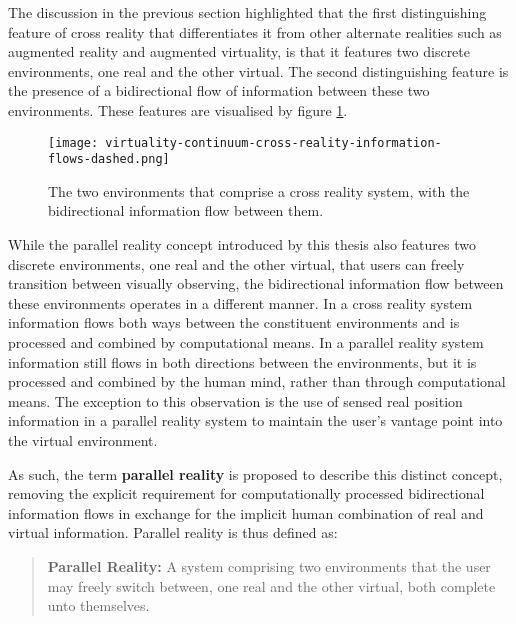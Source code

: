 The discussion in the previous section highlighted that the first distinguishing feature of cross reality that differentiates it from other alternate realities such as augmented reality and augmented virtuality, is that it features two discrete environments, one real and the other virtual. The second distinguishing feature is the presence of a bidirectional flow of information between these two environments. These features are visualised by figure \ref{virtuality-continuum-cross-reality-information-flows-dashed.png}.

\begin{figure}[h]
	\begin{center}
		\texttt{[image: virtuality-continuum-cross-reality-information-flows-dashed.png]}
		\caption{The two environments that comprise a cross reality system, with the bidirectional information flow between them.}
		\label{virtuality-continuum-cross-reality-information-flows-dashed.png}
	\end{center}
\end{figure}

While the parallel reality concept introduced by this thesis also features two discrete environments, one real and the other virtual, that users can freely transition between visually observing, the bidirectional information flow between these environments operates in a different manner. In a cross reality system information flows both ways between the constituent environments and is processed and combined by computational means. In a parallel reality system information still flows in both directions between the environments, but it is processed and combined by the human mind, rather than through computational means. The exception to this observation is the use of sensed real position information in a parallel reality system to maintain the user's vantage point into the virtual environment.

As such, the term \textbf{parallel reality} is proposed to describe this distinct concept, removing the explicit requirement for computationally processed bidirectional information flows in exchange for the implicit human combination of real and virtual information. Parallel reality is thus defined as:

\begin{quote}
	\textbf{Parallel Reality:} A system comprising two environments that the user may freely switch between, one real and the other virtual, both complete unto themselves.
\end{quote}

